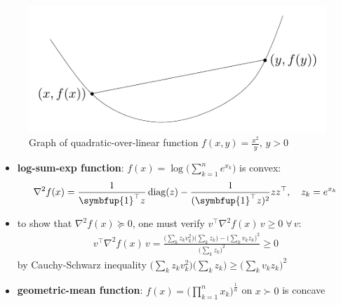 \documentclass[10pt]{beamer}
\newcommand{\ds}{\displaystyle}
\DeclareMathOperator*{\diag}{diag}
\theoremstyle{definition}
\begin{document}
\begin{frame}
\begin{figure}[!htbp]
  \centering
  \includegraphics[scale=1.1,page=3]{fig/note06/03.pdf}
  \caption{Graph of quadratic-over-linear function $\ds f(x, y) = \frac{x^2}{y}$, $y > 0$}
\end{figure}

\begin{itemize}
  \item {\bf log-sum-exp function}: $\ds f(x) = \log\Big(\sum_{k = 1}^n e^{x_k}\Big)$ is convex:
    \begin{align*}
      \nabla^2 f(x) = \frac{1}{\symbfup{1}^\top z}\diag(z) - \frac{1}{(\symbfup{1}^\top z)^2}zz^\top, \quad z_k = e^{x_k}
    \end{align*}
  \item to show that $\nabla^2 f(x)\succcurlyeq 0$, one must verify $\ds v^\top\nabla^2 f(x)\,v\geqslant 0\;\forall\,v$:
    \begin{align*}  
      v^\top\nabla^2 f(x)\,v = \frac{\big(\sum_k z_k v_k^2\big)\big(\sum_k z_k\big) - \big(\sum_k v_k z_k\big)^2}{\big(\sum_k z_k\big)^2}\geqslant 0
    \end{align*}
  by Cauchy-Schwarz inequality $\ds \big(\sum_k z_k v_k^2\big)\big(\sum_k z_k\big) \geqslant \big(\sum_k v_k z_k\big)^2$
  \item {\bf geometric-mean function}: $\ds f(x) = \Big(\prod_{k = 1}^n x_k\Big)^{\frac{1}{n}}$ on $x\succ 0$ is concave
\end{itemize}
\end{frame}
\end{document}
